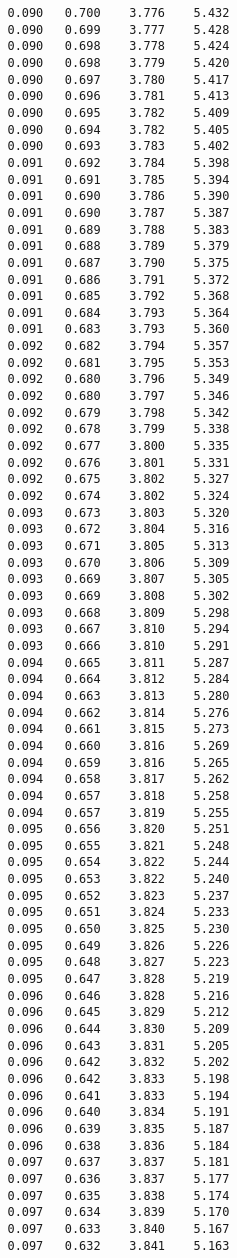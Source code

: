 \begin{verbatim}
   0.090   0.700    3.776    5.432
   0.090   0.699    3.777    5.428
   0.090   0.698    3.778    5.424
   0.090   0.698    3.779    5.420
   0.090   0.697    3.780    5.417
   0.090   0.696    3.781    5.413
   0.090   0.695    3.782    5.409
   0.090   0.694    3.782    5.405
   0.090   0.693    3.783    5.402
   0.091   0.692    3.784    5.398
   0.091   0.691    3.785    5.394
   0.091   0.690    3.786    5.390
   0.091   0.690    3.787    5.387
   0.091   0.689    3.788    5.383
   0.091   0.688    3.789    5.379
   0.091   0.687    3.790    5.375
   0.091   0.686    3.791    5.372
   0.091   0.685    3.792    5.368
   0.091   0.684    3.793    5.364
   0.091   0.683    3.793    5.360
   0.092   0.682    3.794    5.357
   0.092   0.681    3.795    5.353
   0.092   0.680    3.796    5.349
   0.092   0.680    3.797    5.346
   0.092   0.679    3.798    5.342
   0.092   0.678    3.799    5.338
   0.092   0.677    3.800    5.335
   0.092   0.676    3.801    5.331
   0.092   0.675    3.802    5.327
   0.092   0.674    3.802    5.324
   0.093   0.673    3.803    5.320
   0.093   0.672    3.804    5.316
   0.093   0.671    3.805    5.313
   0.093   0.670    3.806    5.309
   0.093   0.669    3.807    5.305
   0.093   0.669    3.808    5.302
   0.093   0.668    3.809    5.298
   0.093   0.667    3.810    5.294
   0.093   0.666    3.810    5.291
   0.094   0.665    3.811    5.287
   0.094   0.664    3.812    5.284
   0.094   0.663    3.813    5.280
   0.094   0.662    3.814    5.276
   0.094   0.661    3.815    5.273
   0.094   0.660    3.816    5.269
   0.094   0.659    3.816    5.265
   0.094   0.658    3.817    5.262
   0.094   0.657    3.818    5.258
   0.094   0.657    3.819    5.255
   0.095   0.656    3.820    5.251
   0.095   0.655    3.821    5.248
   0.095   0.654    3.822    5.244
   0.095   0.653    3.822    5.240
   0.095   0.652    3.823    5.237
   0.095   0.651    3.824    5.233
   0.095   0.650    3.825    5.230
   0.095   0.649    3.826    5.226
   0.095   0.648    3.827    5.223
   0.095   0.647    3.828    5.219
   0.096   0.646    3.828    5.216
   0.096   0.645    3.829    5.212
   0.096   0.644    3.830    5.209
   0.096   0.643    3.831    5.205
   0.096   0.642    3.832    5.202
   0.096   0.642    3.833    5.198
   0.096   0.641    3.833    5.194
   0.096   0.640    3.834    5.191
   0.096   0.639    3.835    5.187
   0.096   0.638    3.836    5.184
   0.097   0.637    3.837    5.181
   0.097   0.636    3.837    5.177
   0.097   0.635    3.838    5.174
   0.097   0.634    3.839    5.170
   0.097   0.633    3.840    5.167
   0.097   0.632    3.841    5.163

\end{verbatim}
